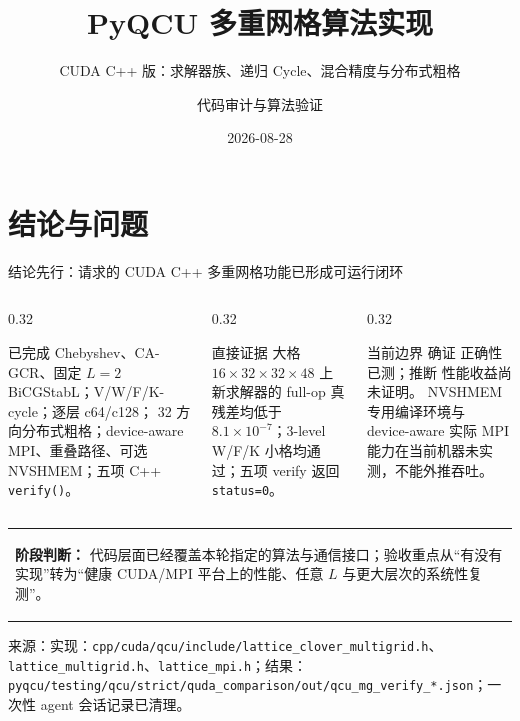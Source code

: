 \documentclass[UTF8,aspectratio=169,11pt]{ctexbeamer}
\title[PyQCU CUDA MG]{PyQCU 多重网格算法实现}
\subtitle{CUDA C++ 版：求解器族、递归 Cycle、混合精度与分布式粗格}
\author[代码审计与算法验证]{代码审计与算法验证}
\institute{PyQCU · Lattice QCD}
\date{2026-08-28}
\newcommand{\source}[1]{%
  \vspace{0.06em}\par{\raggedright\scriptsize\color{muted}来源：#1\par}}
\newcommand{\code}[1]{\nolinkurl{#1}}
\newcommand{\verified}{\textcolor{evidence}{确证}}
\newcommand{\inferred}{\textcolor{accent}{推断}}
\begin{document}
\begin{frame}[plain]
  \titlepage
\end{frame}

\section{结论与问题}

\begin{frame}[t]{结论先行：请求的 CUDA C++ 多重网格功能已形成可运行闭环}
  \begin{columns}[T,totalwidth=\textwidth]
    \begin{column}{0.32\textwidth}
      \begin{block}{已完成}
        \small
        Chebyshev、CA-GCR、固定 $L=2$ BiCGStabL；V/W/F/K-cycle；逐层 c64/c128；
        32 方向分布式粗格；device-aware MPI、重叠路径、可选 NVSHMEM；五项 C++ \code{verify()}。
      \end{block}
    \end{column}
    \begin{column}{0.32\textwidth}
      \begin{block}{直接证据}
        \small
        大格 $16\times32\times32\times48$ 上新求解器的 full-op 真残差均低于
        $8.1\times10^{-7}$；3-level W/F/K 小格均通过；五项 verify 返回 \code{status=0}。
      \end{block}
    \end{column}
    \begin{column}{0.32\textwidth}
      \begin{block}{当前边界}
        \small
        \verified{} 正确性已测；\inferred{} 性能收益尚未证明。
        NVSHMEM 专用编译环境与 device-aware 实际 MPI 能力在当前机器未实测，不能外推吞吐。
      \end{block}
    \end{column}
  \end{columns}
  \vspace{0.25em}
  \begin{tabular}{@{}p{}@{}}
    \colorbox{good}{\parbox{0.92\textwidth}{\textbf{阶段判断：}\quad
      代码层面已经覆盖本轮指定的算法与通信接口；验收重点从“有没有实现”转为“健康 CUDA/MPI 平台上的性能、任意 $L$ 与更大层次的系统性复测”。}}
  \end{tabular}
  \source{实现：\code{cpp/cuda/qcu/include/lattice_clover_multigrid.h}、\code{lattice_multigrid.h}、\code{lattice_mpi.h}；结果：\code{pyqcu/testing/qcu/strict/quda_comparison/out/qcu_mg_verify_*.json}；一次性 agent 会话记录已清理。}
\end{frame}
\end{document}
